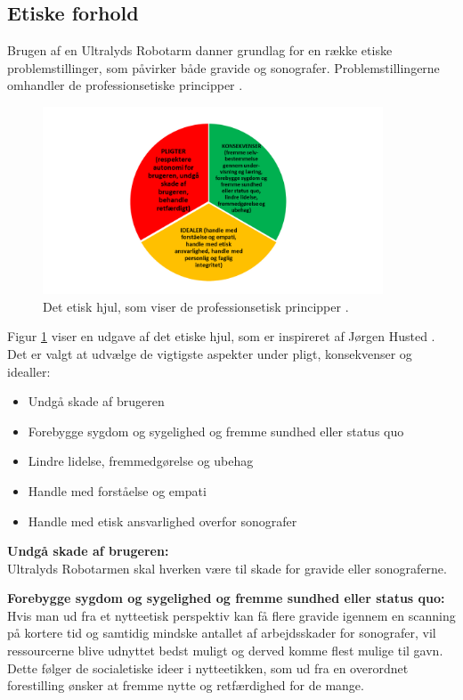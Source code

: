 \subsection{Etiske forhold}
Brugen af en Ultralyds Robotarm danner grundlag for en række etiske problemstillinger, som påvirker både gravide og sonografer. 
Problemstillingerne omhandler de professionsetiske principper \cite{Husted}. 

\begin{figure}[H]\centering
	\includegraphics[width = 0.9\textwidth]{Figurer/Detetiskehjul}
	\caption{Det etisk hjul, som viser de professionsetisk principper \cite{Etiskehjul}.}
	\label{etiskhjul}
\end{figure}

Figur \ref{etiskhjul} viser en udgave af det etiske hjul, som er inspireret af Jørgen Husted \cite{Etiskehjul}. Det er valgt at udvælge de vigtigste aspekter under pligt, konsekvenser og idealler: 
\begin{itemize}
		\item Undgå skade af brugeren
		\item Forebygge sygdom og sygelighed og fremme sundhed eller status quo
		\item Lindre lidelse, fremmedgørelse og ubehag
		\item Handle med forståelse og empati
		\item Handle med etisk ansvarlighed overfor sonografer 
\end{itemize} 

\textbf{Undgå skade af brugeren:} \\
Ultralyds Robotarmen skal hverken være til skade for gravide eller sonograferne.

\textbf{Forebygge sygdom og sygelighed og fremme sundhed eller status quo:} \\
Hvis man ud fra et nytteetisk perspektiv kan få flere gravide igennem en scanning på kortere tid og samtidig mindske antallet af arbejdsskader for sonografer, vil ressourcerne blive udnyttet bedst muligt og derved komme flest mulige til gavn. Dette følger de socialetiske ideer i nytteetikken, som ud fra en overordnet forestilling ønsker at fremme nytte og retfærdighed for de mange.
    
